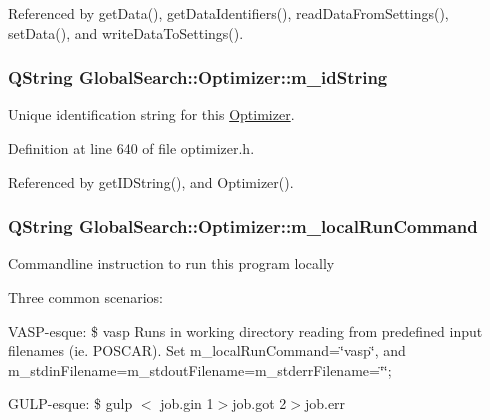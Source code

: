 Referenced by get\-Data(), get\-Data\-Identifiers(), read\-Data\-From\-Settings(), set\-Data(), and write\-Data\-To\-Settings().

\hypertarget{classGlobalSearch_1_1Optimizer_a4d2dc8b7aaa3bb6fed8c28547460def8}{
\subsubsection[{m\-\_\-id\-String}]{\setlength{\rightskip}{0pt plus 5cm}Q\-String Global\-Search\-::\-Optimizer\-::m\-\_\-id\-String\hspace{0.3cm}{\ttfamily [protected]}}}\label{classGlobalSearch_1_1Optimizer_a4d2dc8b7aaa3bb6fed8c28547460def8}
Unique identification string for this \hyperlink{classGlobalSearch_1_1Optimizer}{Optimizer}. 

Definition at line 640 of file optimizer.\-h.



Referenced by get\-I\-D\-String(), and Optimizer().

\hypertarget{classGlobalSearch_1_1Optimizer_a1cdb6b6c5e929e84c834ba93148fb31e}{
\subsubsection[{m\-\_\-local\-Run\-Command}]{\setlength{\rightskip}{0pt plus 5cm}Q\-String Global\-Search\-::\-Optimizer\-::m\-\_\-local\-Run\-Command\hspace{0.3cm}{\ttfamily [protected]}}}\label{classGlobalSearch_1_1Optimizer_a1cdb6b6c5e929e84c834ba93148fb31e}
Commandline instruction to run this program locally

Three common scenarios\-:

V\-A\-S\-P-\/esque\-: \$ vasp Runs in working directory reading from predefined input filenames (ie. P\-O\-S\-C\-A\-R). Set m\-\_\-local\-Run\-Command=\char`\"{}vasp\char`\"{}, and m\-\_\-stdin\-Filename=m\-\_\-stdout\-Filename=m\-\_\-stderr\-Filename=\char`\"{}\char`\"{};

G\-U\-L\-P-\/esque\-: \$ gulp $<$ job.\-gin 1$>$job.\-got 2$>$job.\-err

